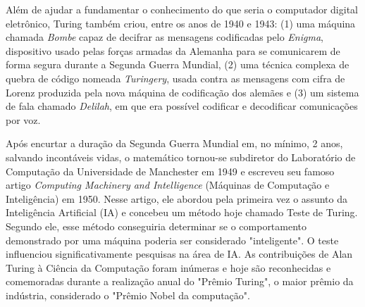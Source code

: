 \documentclass[
  12pt,     %
  openright,      %
  oneside,      %
  a4paper,      %
  english,      %
  brazil        %
  ]{abntex2}
\begin{document}
Além de ajudar a fundamentar o conhecimento do que seria o computador digital eletrônico, Turing também criou, entre os anos de 1940 e 1943: (1) uma máquina chamada \textit{Bombe} capaz de decifrar as mensagens codificadas pelo \textit{Enigma}, dispositivo usado pelas forças armadas da Alemanha para se comunicarem de forma segura durante a Segunda Guerra Mundial, (2) uma técnica complexa de quebra de código nomeada \textit{Turingery}, usada contra as mensagens com cifra de Lorenz produzida pela nova máquina de codificação dos alemães e (3) um sistema de fala chamado \textit{Delilah}, em que era possível codificar e decodificar comunicações por voz.

Após encurtar a duração da Segunda Guerra Mundial em, no mínimo, 2 anos, salvando incontáveis vidas, o matemático tornou-se subdiretor do Laboratório de Computação da Universidade de Manchester em 1949 e escreveu seu famoso artigo \textit{Computing Machinery and Intelligence} (Máquinas de Computação e Inteligência) em 1950. Nesse artigo, ele abordou pela primeira vez o assunto da Inteligência Artificial (IA) e concebeu um método hoje chamado Teste de Turing. Segundo ele, esse método conseguiria determinar se o comportamento demonstrado por uma máquina poderia ser considerado "inteligente".  O teste influenciou significativamente pesquisas na área de IA. As contribuições de Alan Turing à Ciência da Computação foram inúmeras e hoje são reconhecidas e comemoradas durante a realização anual do "Prêmio Turing", o maior prêmio da indústria, considerado o "Prêmio Nobel da computação".


\end{document}
